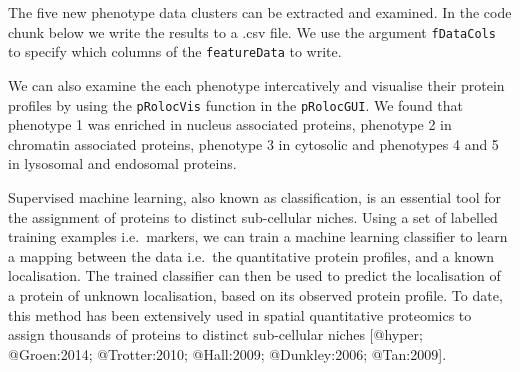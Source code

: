 The five new phenotype data clusters can be extracted and examined. In
the code chunk below we write the results to a .csv file. We use the
argument \texttt{fDataCols} to specify which columns of the
\texttt{featureData} to write.

\begin{Shaded}
\begin{Highlighting}[]
\StringTok{ }\NormalTok{(}
 \NormalTok{, } \NormalTok{, } \NormalTok{)}
\end{Highlighting}
\end{Shaded}

We can also examine the each phenotype intercatively and visualise their
protein profiles by using the \texttt{pRolocVis} function in the
\texttt{pRolocGUI}. We found that phenotype 1 was enriched in nucleus
associated proteins, phenotype 2 in chromatin associated proteins,
phenotype 3 in cytosolic and phenotypes 4 and 5 in lysosomal and
endosomal proteins.

\begin{Shaded}
\begin{Highlighting}[]
 \NormalTok{)}
\end{Highlighting}
\end{Shaded}


Supervised machine learning, also known as classification, is an
essential tool for the assignment of proteins to distinct sub-cellular
niches. Using a set of labelled training examples i.e.~markers, we can
train a machine learning classifier to learn a mapping between the data
i.e.~the quantitative protein profiles, and a known localisation. The
trained classifier can then be used to predict the localisation of a
protein of unknown localisation, based on its observed protein profile.
To date, this method has been extensively used in spatial quantitative
proteomics to assign thousands of proteins to distinct sub-cellular
niches {[}@hyper; @Groen:2014; @Trotter:2010; @Hall:2009; @Dunkley:2006;
@Tan:2009{]}.

